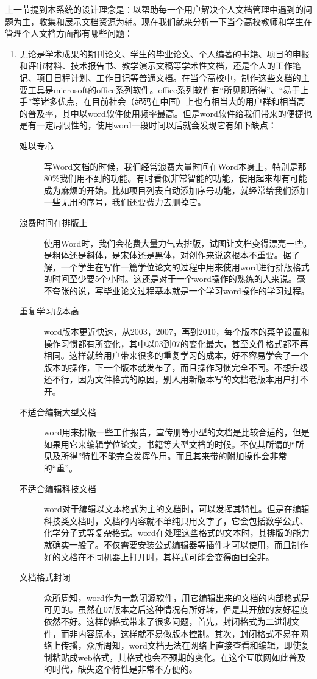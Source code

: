 上一节提到本系统的设计理念是：以帮助每一个用户解决个人文档管理中遇到的问题为主，收集和展示文档资源为辅。现在我们就来分析一下当今高校教师和学生在管理个人文档方面都有哪些问题：
\begin{enumerate}
\item 无论是学术成果的期刊论文、学生的毕业论文、个人编著的书籍、项目的申报和评审材料、技术报告书、教学演示文稿等学术性文档，还是个人的工作笔记、项目日程计划、工作日记等普通文档。在当今高校中，制作这些文档的主要工具是microsoft的office系列软件。office系列软件有“所见即所得”、“易于上手”等诸多优点，在目前社会（起码在中国）上也有相当大的用户群和相当高的普及率，其中以word软件使用频率最高。但是word软件给我们带来的便捷也是有一定局限性的，使用word一段时间以后就会发现它有如下缺点：
  \begin{description}
  \item[难以专心] 写Word文档的时候，我们经常浪费大量时间在Word本身上，特别是那80\%我们用不到的功能。有时看似非常智能的功能，使用起来却有可能成为麻烦的开始。比如项目列表自动添加序号功能，就经常给我们添加一些无用的序号，我们还要费力去删掉它。
  \item[浪费时间在排版上] 使用Word时，我们会花费大量力气去排版，试图让文档变得漂亮一些。是粗体还是斜体，是宋体还是黑体，对创作来说这根本不重要。据了解，一个学生在写作一篇学位论文的过程中用来使用word进行排版格式的时间至少要5个小时。这还是对于一个word操作的熟练的人来说。毫不夸张的说，写毕业论文过程基本就是一个学习word操作的学习过程。
  \item[重复学习成本高] word版本更近快速，从2003，2007，再到2010，每个版本的菜单设置和操作习惯都有所变化，其中以03到07的变化最大，甚至文件格式都不再相同。这样就给用户带来很多的重复学习的成本，好不容易学会了一个版本的操作，下一个版本就发布了，而且操作习惯完全不同。不想升级还不行，因为文件格式的原因，别人用新版本写的文档老版本用户打不开。
  \item[不适合编辑大型文档] word用来排版一些工作报告，宣传册等小型的文档是比较合适的，但是如果用它来编辑学位论文，书籍等大型文档的时候。不仅其所谓的“所见及所得”特性不能完全发挥作用。而且其来带的附加操作会非常的“重”。
  \item[不适合编辑科技文档] word对于编辑以文本格式为主的文档时，可以发挥其特性。但是在编辑科技类文档时，文档的内容就不单纯只用文字了，它会包括数学公式、化学分子式等复杂格式。word在处理这些格式的文本时，其排版的能力就确实一般了。不仅需要安装公式编辑器等插件才可以使用，而且制作好的文档在不同机器上打开时，其样式可能会变得面目全非。
  \item[文档格式封闭] 众所周知，word作为一款闭源软件，用它编辑出来的文档的内部格式是可见的。虽然在07版本之后这种情况有所好转，但是其开放的友好程度依然不好。这样的格式带来了很多问题，首先，封闭格式为二进制文件，而非内容原本，这样就不易做版本控制。其次，封闭格式不易在网络上传播，众所周知，word文档无法在网络上直接查看和编辑，即使复制粘贴成web格式，其格式也会不预期的变化。在这个互联网如此普及的时代，缺失这个特性是非常不方便的。

\end{description}
\end{enumerate}
